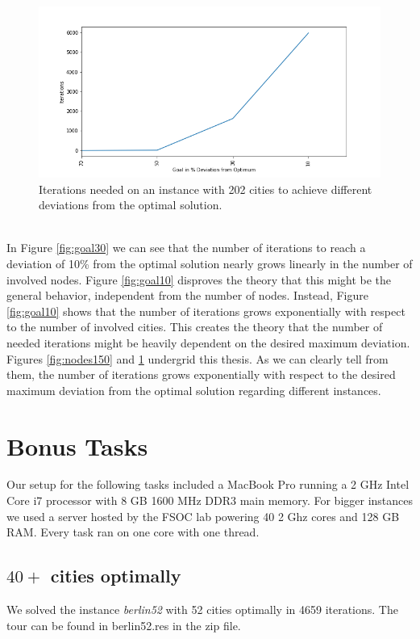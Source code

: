 \documentclass{article}
\begin{document}
\begin{figure}[h]
  \center
  \includegraphics[width=0.7\paperwidth]{Nodes_202.png}
  \caption{Iterations needed on an instance with 202 cities to achieve different deviations from the optimal solution.}
  \label{fig:nodes202}
\end{figure}
\\
In Figure \ref{fig:goal30} we can see that the number of iterations to reach a deviation of 10\% from the optimal solution nearly grows linearly in the number of involved nodes. Figure \ref{fig:goal10} disproves the theory that this might be the general behavior, independent from the number of nodes. Instead, Figure \ref{fig:goal10} shows that the number of iterations grows exponentially with respect to the number of involved cities. This creates the theory that the number of needed iterations might be heavily dependent on the desired maximum deviation.\\
Figures \ref{fig:nodes150} and \ref{fig:nodes202} undergrid this thesis.
As we can clearly tell from them, the number of iterations grows exponentially with respect to the desired maximum deviation from the optimal solution regarding different instances.

\section{Bonus Tasks}

Our setup for the following tasks included a MacBook Pro running a 2 GHz Intel Core i7 processor with 8 GB 1600 MHz DDR3 main memory. For bigger instances we used a server hosted by the FSOC lab powering 40 2 Ghz cores and 128 GB RAM. Every task ran on one core with one thread.

\subsection{$40+$ cities optimally}
We solved the instance \textit{berlin52} with 52 cities optimally in 4659 iterations. The tour can be found in berlin52.res in the zip file.
\end{document}
